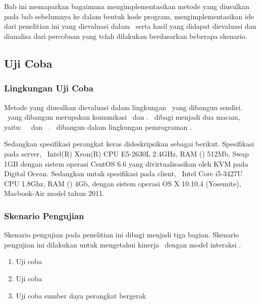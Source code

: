 \chapter{\babEmpat}

Bab ini memaparkan bagaimana mengimplementasikan metode yang diusulkan pada bab
sebelumnya ke dalam bentuk kode program, mengimplementasikan ide dari penelitian
ini yang dievaluasi dalam \testbed~serta hasil yang didapat dievaluasi dan
dianalisa dari percobaan yang telah dilakukan berdasarkan beberapa skenario.

\section{Uji Coba}

\subsection{Lingkungan Uji Coba}

Metode yang diusulkan dievaluasi dalam lingkungan \testbed~yang dibangun
sendiri. \Testbed~yang dibangun merupakan komunikasi \server~dan \client.
\Client~dibagi menjadi dua macam, yaitu: \publiser~\client~dan
\subscriber~\client. \Testbed~dibangun dalam lingkungan pemrograman \nodejs.

Sedangkan spesifikasi perangkat keras dideskripsikan sebagai berikut.
Spesifikasi pada server, \processor~Intel(R) Xeon(R) CPU E5-2630L 2.4GHz, RAM
(\ram) 512Mb, Swap 1GB dengan sistem operasi CentOS 6.6 yang divirtualisasikan
oleh KVM pada Digital Ocean. Sedangkan untuk spesifikasi pada client,
\processor~Intel Core i5-3427U CPU 1.8Ghz, RAM (\ram) 4Gb, dengan sistem operasi
OS X 10.10.4 (Yosemite), Macbook-Air model tahun 2011.


\subsection{Skenario Pengujian}

Skenario pengujian pada penelitian ini dibagi menjadi tiga bagian. Skenario
pengujian ini dilakukan untuk mengetahui kinerja \tracking~dengan model
interaksi \pubsub.

\begin{enumerate}
  [label=\alph*.
  ,noitemsep
  ,nolistsep
  ,leftmargin=0cm
  ,itemindent=.5cm
  ,listparindent=\parindent
  ]

  \item Uji coba \bandwidth

  \item Uji coba \latency

  \item Uji coba sumber daya perangkat bergerak

\end{enumerate}

